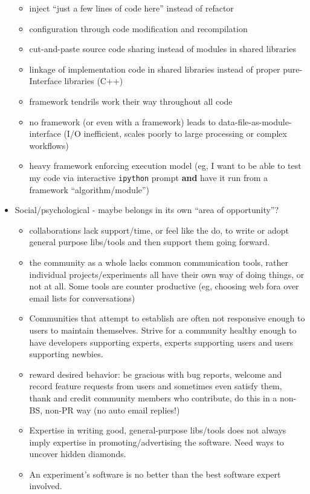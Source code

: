 \begin{itemize}
\begin{itemize}
  \item inject ``just a few lines of code here'' instead of refactor
  \item configuration through code modification and recompilation
  \item cut-and-paste source code sharing instead of modules in shared libraries
  \item linkage of implementation code in shared libraries instead of proper pure-Interface libraries (C++)
  \item framework tendrils work their way throughout all code
  \item no framework (or even with a framework) leads to data-file-as-module-interface (I/O inefficient, scales poorly to large processing or complex workflows)
  \item heavy framework enforcing execution model (eg, I want to be
    able to test my code via interactive \texttt{ipython} prompt
    \textbf{and} have it run from a framework ``algorithm/module'')
  \end{itemize}
\item Social/psychological - maybe belongs in its own ``area of opportunity''?
  \begin{itemize}
\item collaborations lack support/time, or feel like the do, to write or adopt general purpose libs/tools and then support them going forward.
\item the community as a whole lacks common communication tools, rather individual projects/experiments all have their own way of doing things, or not at all.  Some tools are counter productive (eg, choosing web fora over email lists for conversations)
\item Communities that attempt to establish are often not responsive enough to users to maintain themselves.  Strive for a community healthy enough to have developers supporting experts, experts supporting users and users supporting newbies.
\item reward desired behavior: be gracious with bug reports, welcome and record feature requests from users and sometimes even satisfy them, thank and credit community members who contribute, do this in a non-BS, non-PR way (no auto email replies!)
\item Expertise in writing good, general-purpose libs/tools does not always imply expertise in promoting/advertising the software.  Need ways to uncover hidden diamonds.
\item An experiment's software is no better than the best software expert involved.

\end{itemize}
\end{itemize}
